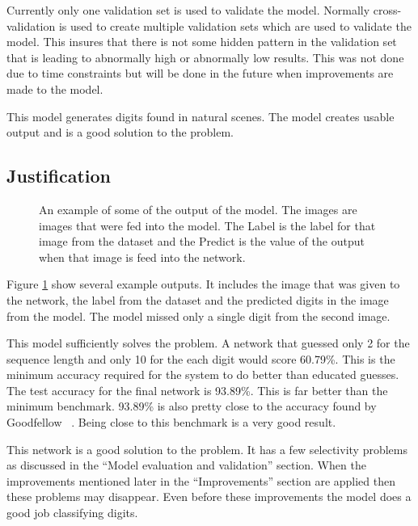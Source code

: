 \documentclass[12pt,twocolumn,letterpaper]{article}
\begin{document}
Currently only one validation set is used to validate the model. Normally cross-validation 
is used to create multiple validation sets which are used to validate the model. This 
insures that there is not some hidden pattern in the validation set that is leading 
to abnormally high or abnormally low results. This was not done due to time 
constraints but will be done in the future when improvements are made to the model.

This model generates digits found in natural scenes. The model creates usable 
output and is a good solution to the problem.

\subsection{Justification}

\begin{figure}[t]
\begin{center}
\end{center}
   \caption{An example of some of the output of the model. The images are images
   that were fed into the model. The Label is the label for that image from the 
   dataset and the Predict is the value of the output when that image is feed into 
   the network.}
\label{fig:output}
\end{figure}

Figure \ref{fig:output} show several example outputs. It includes the image that 
was given to the network, the label from the dataset and the predicted digits 
in the image from the model. The model missed only a single digit from the second 
image. 

This model sufficiently solves the problem. A network that guessed only 2 for the 
sequence length and only 10 for the each digit would score 60.79\%. This is the 
minimum accuracy required for the system to do better than educated guesses. The
test accuracy for the final network is 93.89\%. This is far better than the 
minimum benchmark. 93.89\% is also pretty close to the accuracy found by Goodfellow
\etal ~\cite{goodfellow}. Being close to this benchmark is a very good result.

This network is a good solution to the problem. It has a few selectivity problems 
as discussed in the ``Model evaluation and validation'' section. When the 
improvements mentioned later in the ``Improvements'' section are applied then 
these problems may disappear. Even before these improvements the model does a 
good job classifying digits.
\end{document}
